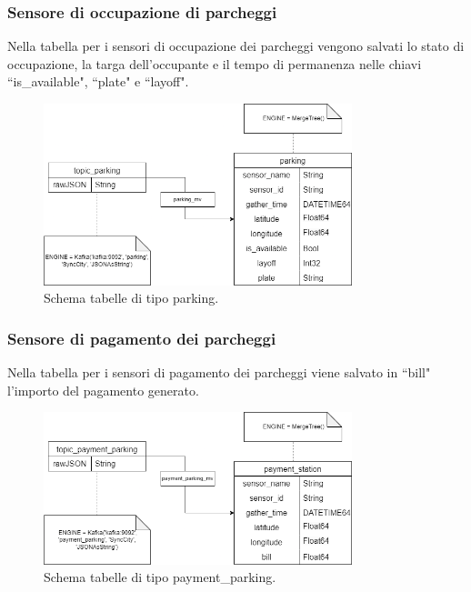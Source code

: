 \documentclass[8pt]{article}
\begin{document}
\subsubsection{Sensore di occupazione di parcheggi}
Nella tabella per i sensori di occupazione dei parcheggi vengono salvati lo stato di occupazione, la targa dell'occupante e il tempo di permanenza nelle chiavi ``is\_available", ``plate" e ``layoff".
\begin{figure}[h!]
    \centering
    \includegraphics[width=0.8\textwidth]{images_st/tabelle_parking.png}
    \caption{Schema tabelle di tipo parking.}
    \label{fig:Schema tabelle di tipo parking}
\end{figure}
\subsubsection{Sensore di pagamento dei parcheggi}
Nella tabella per i sensori di pagamento dei parcheggi viene salvato in ``bill" l'importo del pagamento generato.
\begin{figure}[h!]
    \centering
    \includegraphics[width=0.8\textwidth]{images_st/tabelle_payment_parking.png}
    \caption{Schema tabelle di tipo payment\_parking.}
    \label{fig:Schema tabelle di tipo payment_parking}
\end{figure}
\clearpage
\end{document}
